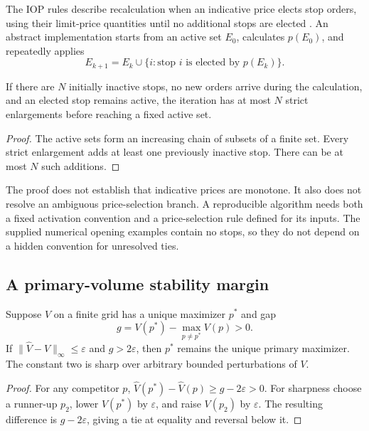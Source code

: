 The IOP rules describe recalculation when an indicative price elects stop orders, using their limit-price quantities until no additional stops are elected \citep{CMEIOPRules}. An abstract implementation starts from an active set $E_0$, calculates $p(E_0)$, and repeatedly applies
\begin{equation}
 E_{k+1}=E_k\cup\{i:\text{stop }i\text{ is elected by }p(E_k)\}.
\end{equation}

\begin{proposition}
If there are $N$ initially inactive stops, no new orders arrive during the calculation, and an elected stop remains active, the iteration has at most $N$ strict enlargements before reaching a fixed active set.
\end{proposition}
\begin{proof}
The active sets form an increasing chain of subsets of a finite set. Every strict enlargement adds at least one previously inactive stop. There can be at most $N$ such additions.
\end{proof}

The proof does not establish that indicative prices are monotone. It also does not resolve an ambiguous price-selection branch. A reproducible algorithm needs both a fixed activation convention and a price-selection rule defined for its inputs. The supplied numerical opening examples contain no stops, so they do not depend on a hidden convention for unresolved ties.

\subsection{A primary-volume stability margin}

\begin{proposition}\label{prop:gap}
Suppose $V$ on a finite grid has a unique maximizer $p^*$ and gap
\begin{equation}
 g=V(p^*)-\max_{p\ne p^*}V(p)>0.
\end{equation}
If $\|\widehat V-V\|_\infty\le\varepsilon$ and $g>2\varepsilon$, then $p^*$ remains the unique primary maximizer. The constant two is sharp over arbitrary bounded perturbations of $V$.
\end{proposition}
\begin{proof}
For any competitor $p$, $\widehat V(p^*)-\widehat V(p)\ge g-2\varepsilon>0$. For sharpness choose a runner-up $p_2$, lower $V(p^*)$ by $\varepsilon$, and raise $V(p_2)$ by $\varepsilon$. The resulting difference is $g-2\varepsilon$, giving a tie at equality and reversal below it.
\end{proof}

